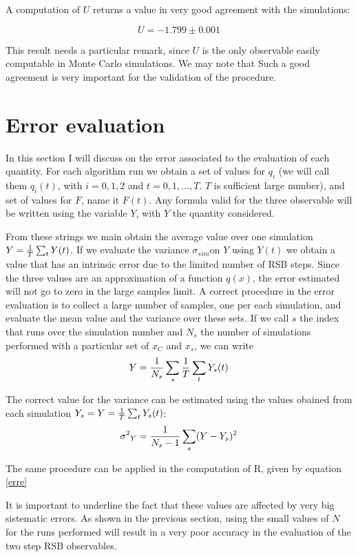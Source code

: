 A computation of $U$ returns a value in very good agreement with the simulations:


\begin{equation}
U = -  1.799 \pm 0.001
\end{equation}

This result needs a particular remark, since $U$ is the only observable easily computable in Monte Carlo simulations.
We may note that
Such a good agreement is very important for the validation of the procedure.

\section{Error evaluation}

In this section I will discuss on the error associated to the evaluation of each quantity.  For each algorithm run we obtain a set of values for $q_i$ (we will call them $q_i(t)$, with $i = {0,1,2}$ and $t=0,1,\ldots,T$. $T$ is sufficient large number), and  set of values for $F$, name it $F(t)$. Any formula valid for the three observable will be written using the variable $Y$, with $Y$ the quantity considered.

From these strings we main obtain the average value over one simulation $Y = {1\over T}\sum_t Y(t)$. If we evaluate the variance $\sigma_{sim}$on $Y$ using $Y(t)$ we obtain a value that has an intrinsic error due to the limited number of RSB steps. Since the three values are an approximation of a function $q(x)$, the error estimated will not go to zero in the large samples limit. A correct procedure in the error evaluation is to collect a large number of samples, one per each simulation, and evaluate the mean value and the variance over these sets. If we call $s$ the index that runs over the simulation number and $N_s$ the number of simulations performed with a particular set of $x_C$ and $x_s$, we can write
\begin{equation}
Y={1\over N_s} \sum_s {1\over T} \sum_t Y_s (t)
\end{equation}

The correct value for the variance can be estimated using the values obained from each simulation $Y_s = Y = {1\over T}\sum_t Y_s(t)$:
\begin{equation}
{\sigma^2}_Y={1\over N_s - 1} \sum_s (Y-Y_s)^2
\end{equation}

The same procedure can be applied in the computation of R, given by equation \ref{erre}

It is important to underline the fact that these values are affected by very big sistematic errors. As shown in the previous section, using the small values of $N$ for the runs performed will result in a very poor accuracy in the evaluation of the two step RSB observables.




